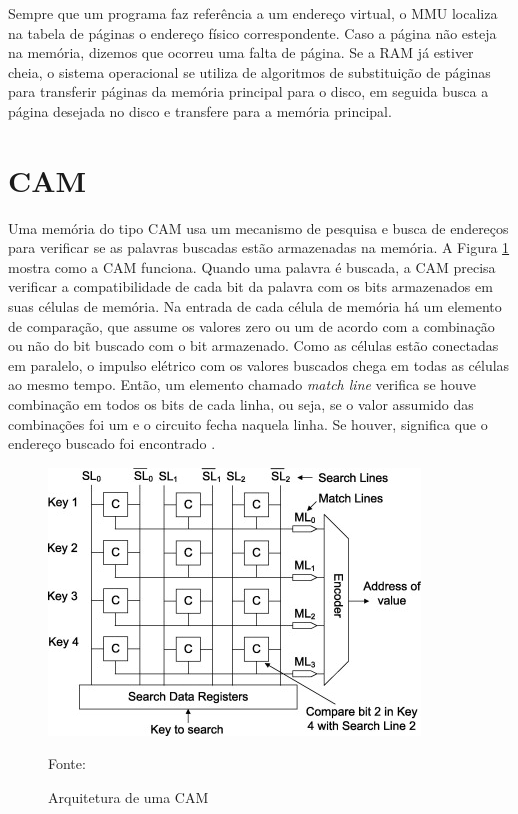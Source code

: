 Sempre que um programa faz referência a um
endereço virtual, o MMU localiza na tabela de páginas o endereço físico correspondente.
Caso a página não esteja na memória, dizemos que ocorreu uma falta de página. Se a RAM
já estiver cheia, o sistema operacional se utiliza de algoritmos de substituição de páginas
para transferir páginas da memória principal para o disco, em seguida busca a página
desejada no disco e transfere para a memória principal.

\section{CAM}

Uma memória do tipo CAM usa um mecanismo de pesquisa e busca de endereços para verificar se as palavras buscadas estão armazenadas na memória. A Figura \ref{fig:cam} mostra como a CAM funciona. Quando uma palavra é buscada, a CAM precisa verificar a compatibilidade de cada bit da palavra com os bits armazenados em suas células de memória. Na entrada de cada célula de memória há um elemento de comparação, que assume os valores zero ou um de acordo com a combinação ou não do bit buscado com o bit armazenado. Como as células estão conectadas em paralelo, o impulso elétrico com os valores buscados chega em todas as células ao mesmo tempo. Então, um elemento chamado \textit{match line} verifica se houve combinação em todos os bits de cada linha, ou seja, se o valor  assumido das combinações foi um e o circuito fecha naquela linha. Se houver, significa que o endereço buscado foi encontrado \cite{maestro2013soft}.

\begin{figure}[ht]
    \centering
    \includegraphics[scale=0.7]{figuras/cam.png}
    \caption{Arquitetura de uma CAM}{Fonte: \cite{maestro2013soft}}
    \label{fig:cam}
\end{figure}

